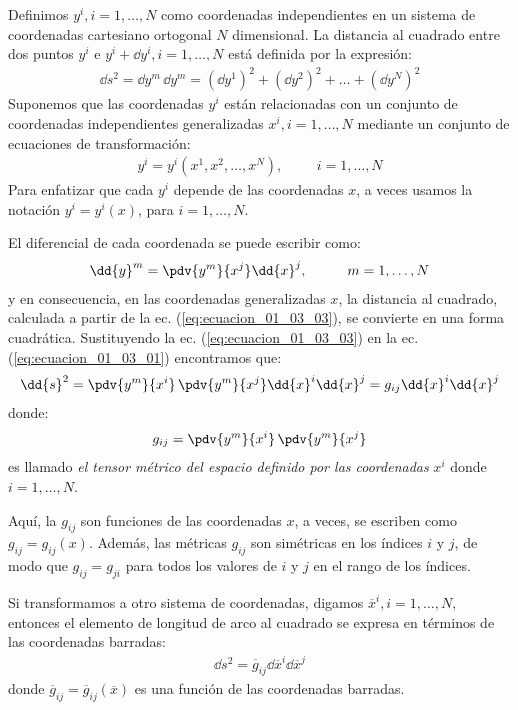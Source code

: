 Definimos $y^{i}, i = 1, \ldots, N$ como coordenadas independientes en un sistema de coordenadas cartesiano ortogonal $N$ dimensional. La distancia al cuadrado entre dos puntos $y^{i}$ e $y^{i} + \dd{y}^{i}, i = 1, \ldots, N$ está definida por la expresión:
\begin{align}
\dd{s}^{2} = \dd{y}^{m} \, \dd{y}^{m} = (\dd{y}^{1})^{2} + (\dd{y}^{2})^{2} + \ldots + (\dd{y}^{N})^{2}
\label{eq:ecuacion_01_03_01}
\end{align}
Suponemos que las coordenadas $y^{i}$ están relacionadas con un conjunto de coordenadas independientes generalizadas $x^{i}, i = 1, \ldots, N$ mediante un conjunto de ecuaciones de transformación:
\begin{align}
y^{i} = y^{i} (x^{1}, x^{2}, \ldots, x^{N}), \hspace{1cm} i = 1, \ldots, N
\label{eq:ecuacion_01_03_02}
\end{align}
Para enfatizar que cada $y^{i}$ depende de las coordenadas $x$, a veces usamos la notación $y^{i} = y^{i} (x)$, para $i = 1, \ldots, N$.
\par
El diferencial de cada coordenada se puede escribir como:
\begin{align}
\dd{y}^{m} = \pdv{y^{m}}{x^{j}} \dd{x}^{j}, \hspace{1cm} m = 1, \ldots, N
\label{eq:ecuacion_01_03_03}
\end{align}
y en consecuencia, en las coordenadas generalizadas $x$, la distancia al cuadrado, calculada a partir de la ec. (\ref{eq:ecuacion_01_03_03}), se convierte en una forma cuadrática. Sustituyendo la ec. (\ref{eq:ecuacion_01_03_03}) en la ec. (\ref{eq:ecuacion_01_03_01}) encontramos que:
\begin{align}
\dd{s}^{2} = \pdv{y^{m}}{x^{i}} \, \pdv{y^{m}}{x^{j}} \dd{x}^{i} \dd{x}^{j} = g_{ij} \dd{x}^{i} \dd{x}^{j}
\label{eq:ecuacion_01_03_04}
\end{align}
donde:
\begin{align}
g_{ij} = \pdv{y^{m}}{x^{i}} \, \pdv{y^{m}}{x^{j}}
\end{align}
es llamado \emph{el tensor métrico del espacio definido por las coordenadas} $x^{i}$ donde \hfill \break $i = 1, \ldots, N$.
\par
Aquí, la $g_{ij}$ son funciones de las coordenadas $x$, a veces, se escriben como $g_{ij} = g_{ij} (x)$. Además, las métricas $g_{ij}$ son simétricas en los índices $i$ y $j$, de modo que $g_{ij} = g_{ji}$ para todos los valores de $i$ y $j$ en el rango de los índices.
\par
Si transformamos a otro sistema de coordenadas, digamos $\overline{x}^{i}, i = 1, \ldots, N$, entonces el elemento de longitud de arco al cuadrado se expresa en términos de las coordenadas barradas:
\begin{align*}
\dd{s}^{2} = \overline{g}_{ij} \dd{\overline{x}}^{i} \dd{\overline{x}}^{j}
\end{align*}
donde $\overline{g}_{ij} = \overline{g}_{ij} (\overline{x})$ es una función de las coordenadas barradas.


